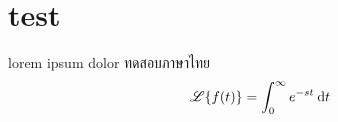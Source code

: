 \documentclass[final,11pt]{article}
\begin{document}
\section{test}
lorem ipsum dolor ทดสอบภาษาไทย
$$\mathscr{L}\lbrace f(t)\rbrace = \int_{0}^{\infty} e^{-st} \:\mathrm{d} t$$
\end{document}
